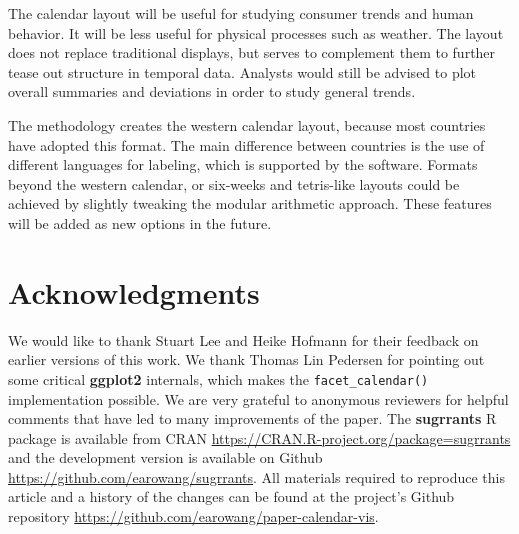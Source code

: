 \documentclass[12pt]{article}
\begin{document}
The calendar layout will be useful for studying consumer trends and human behavior. It will be less useful for physical processes such as weather. The layout does not replace traditional displays, but serves to complement them to further tease out structure in temporal data. Analysts would still be advised to plot overall summaries and deviations in order to study general trends.

The methodology creates the western calendar layout, because most countries have adopted this format. The main difference between countries is the use of different languages for labeling, which is supported by the software. Formats beyond the western calendar, or six-weeks and tetris-like layouts could be achieved by slightly tweaking the modular arithmetic approach. These features will be added as new options in the future.

\hypertarget{acknowledgments}{%
\section*{Acknowledgments}\label{acknowledgments}}

We would like to thank Stuart Lee and Heike Hofmann for their feedback on earlier versions of this work. We thank Thomas Lin Pedersen for pointing out some critical \textbf{ggplot2} internals, which makes the \texttt{facet\_calendar()} implementation possible. We are very grateful to anonymous reviewers for helpful comments that have led to many improvements of the paper. The \textbf{sugrrants} R package is available from CRAN \url{https://CRAN.R-project.org/package=sugrrants} and the development version is available on Github \url{https://github.com/earowang/sugrrants}. All materials required to reproduce this article and a history of the changes can be found at the project's Github repository \url{https://github.com/earowang/paper-calendar-vis}.



\end{document}
